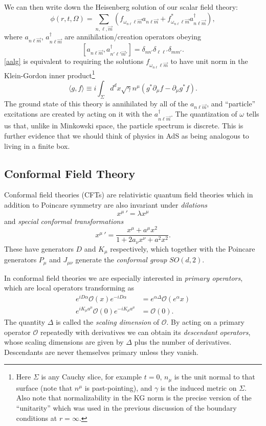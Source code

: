 \documentclass[toc]{PoS}
\newcommand{\be}{\begin{equation}}
\newcommand{\ee}{\end{equation}}
\newcommand{\lan}{\langle}
\newcommand{\ran}{\rangle}
\newcommand{\mO}{\mathcal{O}}
\begin{document}
We can then write down the Heisenberg solution of our scalar field theory:
\be\label{freef}
\phi(r,t,\Omega)=\sum_{n,\ell,\vec{m}}\left(f_{\omega_{n\ell}\ell \vec{m}}a_{n\ell \vec{m}}+f_{\omega_{n\ell}\ell \vec{m}}^*a_{n\ell \vec{m}}^\dagger\right),
\ee
where $a_{n\ell\vec{m}}$, $a_{n\ell\vec{m}}^\dagger$ are annihilation/creation operators obeying
\be\label{aalg}
[a_{n\ell\vec{m}},a_{n'\ell'\vec{m}'}^\dagger]=\delta_{nn'}\delta_{\ell\ell'} \delta_{mm'}.
\ee
\eqref{aalg} is equivalent to requiring the solutions $f_{\omega_{n\ell}\ell \vec{m}}$ to have unit norm in the Klein-Gordon inner product\footnote{Here $\Sigma$ is any Cauchy slice, for example $t=0$, $n_\mu$ is the unit normal to that surface (note that $n^\mu$ is past-pointing), and $\gamma$ is the induced metric on $\Sigma$.  Also note that normalizability in the KG norm is the precise version of the ``unitarity'' which was used in the previous discussion of the boundary conditions at $r=\infty$.}
\be\label{KGn}
\lan g,f\ran\equiv i \int_{\Sigma}d^d x \sqrt{\gamma}n^\mu \left(g^*\partial_\mu f-\partial_\mu g^* f\right).
\ee
The ground state of this theory is annihilated by all of the $a_{n\ell\vec{m}}$, and ``particle'' excitations are created by acting on it with the $a_{n\ell\vec{m}}^\dagger$.  The quantization of $\omega$ tells us that, unlike in Minkowski space, the particle spectrum is discrete.  This is further evidence that we should think of physics in AdS as being analogous to living in a finite box.  

\subsection{Conformal Field Theory}
Conformal field theories (CFTs) are relativistic quantum field theories which in addition to Poincare symmetry are also invariant under \textit{dilations}
\be
x^{\mu}\,'=\lambda x^\mu
\ee
and \textit{special conformal transformations}
\be
x^{\mu}\,'=\frac{x^\mu+a^\mu x^2}{1+2a_\nu x^\nu+a^2 x^2}.
\ee
These have generators $D$ and $K_\mu$ respectively, which together with the Poincare generators $P_\mu$ and $J_{\mu\nu}$ generate the \textit{conformal group} $SO(d,2)$.  

In conformal field theories we are especially interested in \textit{primary operators}, which are local operators transforming as
\begin{align}\nonumber
e^{i D \alpha}\mO(x) e^{-i D\alpha}&=e^{\alpha \Delta}\mO\left(e^{\alpha}x\right)\\
e^{i K_\mu a^\mu} \mO(0)e^{-iK_\mu a^\mu}&=\mO(0).
\end{align}
The quantity $\Delta$ is called the \textit{scaling dimension} of $\mO$.  By acting on a primary operator $\mO$ repeatedly with derivatives we can obtain its \textit{descendant operators}, whose scaling dimensions are given by $\Delta$ plus the number of derivatives.  Descendants are never themselves primary unless they vanish.   
\end{document}
